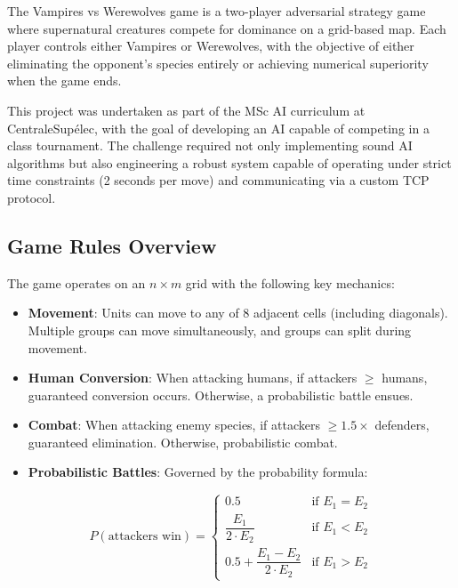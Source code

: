 \documentclass[11pt,a4paper]{article}
\begin{document}
The Vampires vs Werewolves game is a two-player adversarial strategy game where supernatural creatures compete for dominance on a grid-based map. Each player controls either Vampires or Werewolves, with the objective of either eliminating the opponent's species entirely or achieving numerical superiority when the game ends.

This project was undertaken as part of the MSc AI curriculum at CentraleSup\'elec, with the goal of developing an AI capable of competing in a class tournament. The challenge required not only implementing sound AI algorithms but also engineering a robust system capable of operating under strict time constraints (2 seconds per move) and communicating via a custom TCP protocol.

\subsection{Game Rules Overview}

The game operates on an $n \times m$ grid with the following key mechanics:

\begin{itemize}[leftmargin=*]
    \item \textbf{Movement}: Units can move to any of 8 adjacent cells (including diagonals). Multiple groups can move simultaneously, and groups can split during movement.

    \item \textbf{Human Conversion}: When attacking humans, if attackers $\geq$ humans, guaranteed conversion occurs. Otherwise, a probabilistic battle ensues.

    \item \textbf{Combat}: When attacking enemy species, if attackers $\geq 1.5 \times$ defenders, guaranteed elimination. Otherwise, probabilistic combat.

    \item \textbf{Probabilistic Battles}: Governed by the probability formula:
\end{itemize}

\begin{equation}
P(\text{attackers win}) = \begin{cases}
0.5 & \text{if } E_1 = E_2 \\[0.3em]
\dfrac{E_1}{2 \cdot E_2} & \text{if } E_1 < E_2 \\[0.5em]
0.5 + \dfrac{E_1 - E_2}{2 \cdot E_2} & \text{if } E_1 > E_2
\end{cases}
\label{eq:battle_prob}
\end{equation}
\end{document}
